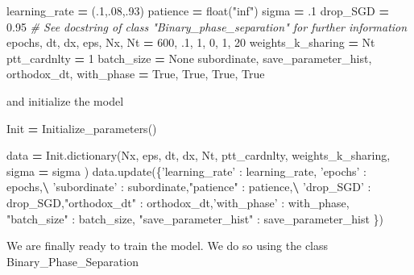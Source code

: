 \documentclass[openany,twoside]{book}
\newenvironment{Shaded}{\begin{snugshade}}{\end{snugshade}}
\newcommand{\BuiltInTok}[1]{#1}
\newcommand{\CommentTok}[1]{\textcolor[rgb]{0.56,0.35,0.01}{\textit{#1}}}
\newcommand{\DecValTok}[1]{\textcolor[rgb]{0.00,0.00,0.81}{#1}}
\newcommand{\FloatTok}[1]{\textcolor[rgb]{0.00,0.00,0.81}{#1}}
\newcommand{\NormalTok}[1]{#1}
\newcommand{\OperatorTok}[1]{\textcolor[rgb]{0.81,0.36,0.00}{\textbf{#1}}}
\newcommand{\StringTok}[1]{\textcolor[rgb]{0.31,0.60,0.02}{#1}}
\newcommand{\VariableTok}[1]{\textcolor[rgb]{0.00,0.00,0.00}{#1}}
\begin{document}
\begin{Shaded}
\begin{Highlighting}[]
\NormalTok{learning_rate }\OperatorTok{=}\NormalTok{ (.}\DecValTok{1}\NormalTok{,.}\DecValTok{08}\NormalTok{,.}\DecValTok{93}\NormalTok{)}
\NormalTok{patience }\OperatorTok{=} \BuiltInTok{float}\NormalTok{(}\StringTok{"inf"}\NormalTok{)}
\NormalTok{sigma }\OperatorTok{=} \FloatTok{.1}
\NormalTok{drop_SGD }\OperatorTok{=} \FloatTok{0.95}  \CommentTok{# See  docstring of class "Binary_phase_separation" for further information}
\NormalTok{epochs, dt, dx, eps, Nx, Nt }\OperatorTok{=} \DecValTok{600}\NormalTok{, }\FloatTok{.1}\NormalTok{, }\DecValTok{1}\NormalTok{, }\DecValTok{0}\NormalTok{, }\DecValTok{1}\NormalTok{, }\DecValTok{20}
\NormalTok{weights_k_sharing }\OperatorTok{=}\NormalTok{ Nt}
\NormalTok{ptt_cardnlty }\OperatorTok{=} \DecValTok{1}
\NormalTok{batch_size }\OperatorTok{=} \VariableTok{None}
\NormalTok{subordinate, save_parameter_hist, orthodox_dt, with_phase }\OperatorTok{=} \VariableTok{True}\NormalTok{, }\VariableTok{True}\NormalTok{, }\VariableTok{True}\NormalTok{, }\VariableTok{True}
\end{Highlighting}
\end{Shaded}

and initialize the model

\begin{Shaded}
\begin{Highlighting}[]
\NormalTok{Init }\OperatorTok{=}\NormalTok{ Initialize_parameters()   }

\NormalTok{data }\OperatorTok{=}\NormalTok{ Init.dictionary(Nx, eps, dt, dx, Nt, ptt_cardnlty, weights_k_sharing, sigma }\OperatorTok{=}\NormalTok{ sigma )}
\NormalTok{data.update(\{}\StringTok{'learning_rate'}\NormalTok{ :  learning_rate, }\StringTok{'epochs'}\NormalTok{ :  epochs,}\OperatorTok{\textbackslash{}}
             \StringTok{'subordinate'}\NormalTok{ :  subordinate,}\StringTok{"patience"}\NormalTok{ : patience,}\OperatorTok{\textbackslash{}}
             \StringTok{'drop_SGD'}\NormalTok{ : drop_SGD,}\StringTok{"orthodox_dt"}\NormalTok{ : orthodox_dt,}\StringTok{'with_phase'}\NormalTok{ : with_phase,}
             \StringTok{"batch_size"}\NormalTok{ : batch_size, }\StringTok{"save_parameter_hist"}\NormalTok{ : save_parameter_hist \})}
\end{Highlighting}
\end{Shaded}

We are finally ready to train the model. We do so using the class Binary\_Phase\_Separation
\end{document}
